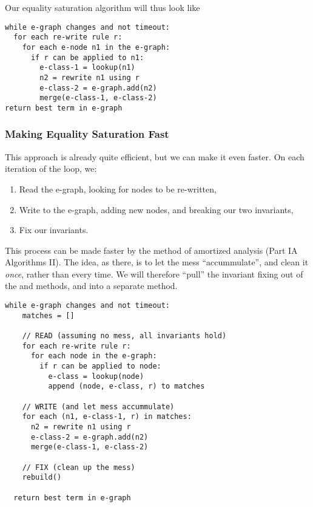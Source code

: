 Our equality saturation algorithm will thus look like

\begin{lstlisting}[style=pseudocode]
while e-graph changes and not timeout: 
  for each re-write rule r:
    for each e-node n1 in the e-graph:
      if r can be applied to n1:
        e-class-1 = lookup(n1)
        n2 = rewrite n1 using r
        e-class-2 = e-graph.add(n2)
        merge(e-class-1, e-class-2)
return best term in e-graph
\end{lstlisting}

\subsubsection{Making Equality Saturation Fast}
This approach is already quite efficient, but we can make it even faster. On each iteration of the loop, we:
\begin{enumerate}
  \item Read the e-graph, looking for nodes to be re-written, 
  \item Write to the e-graph, adding new nodes, and breaking our two invariants, 
  \item Fix our invariants.
\end{enumerate}

This process can be made faster by the method of amortized analysis (\textsf{Part IA Algorithms II}). The idea, as there, is to 
let the mess ``accummulate'', and clean it \textit{once}, rather than every time. We will therefore ``pull'' the invariant fixing out of 
the  and  methods, and into a separate  method.

\begin{lstlisting}[style=pseudocode]
  while e-graph changes and not timeout: 
    matches = []

    // READ (assuming no mess, all invariants hold)
    for each re-write rule r:
      for each node in the e-graph:
        if r can be applied to node:
          e-class = lookup(node)
          append (node, e-class, r) to matches
    
    // WRITE (and let mess accummulate)     
    for each (n1, e-class-1, r) in matches:
      n2 = rewrite n1 using r
      e-class-2 = e-graph.add(n2)
      merge(e-class-1, e-class-2)
    
    // FIX (clean up the mess)
    rebuild()

  return best term in e-graph
\end{lstlisting}

